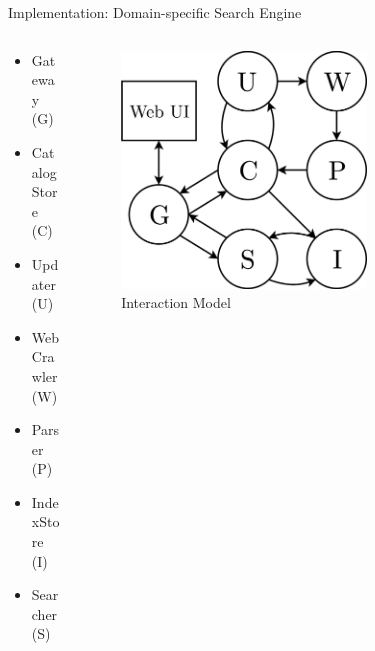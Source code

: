 \documentclass{beamer}
\begin{document}
\begin{frame}{Implementation: Domain-specific Search Engine}

\pause

\begin{columns}
  \begin{column}{0.47\textwidth}
    \begin{itemize}
      \item Gateway (G) 
      \item CatalogStore (C)
      \item Updater (U)
      \item Web Crawler (W)
      \item Parser (P)
      \item IndexStore (I)
      \item Searcher (S)
    \end{itemize}
  \end{column}
  \begin{column}{0.5\textwidth}
    \begin{figure} 
      \includegraphics[width=0.7\textwidth]{graphics/interaction-model.png} 
      \caption{Interaction Model}
    \end{figure}
  \end{column}
\end{columns}

\end{frame}

\end{document}
